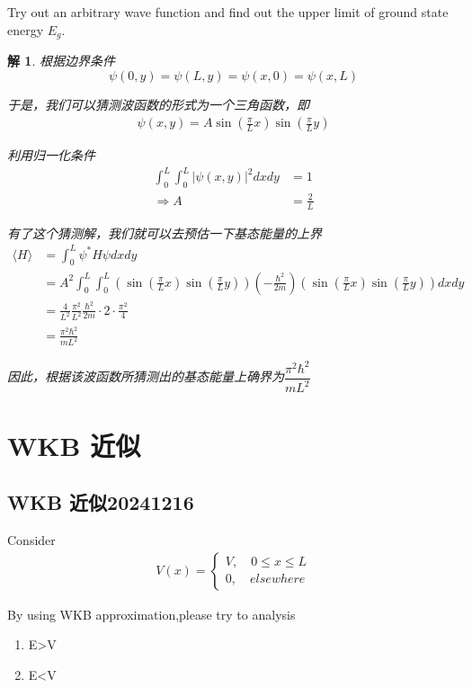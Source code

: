 \documentclass{article}
\newtheorem{solution}{解}
\newcommand{\expectation}[1]{\langle #1 \rangle}
\begin{document}
Try out an arbitrary wave function and find out the upper limit of ground state energy $E_g$.


\begin{solution}
    根据边界条件
    \[
        \psi(0,y)=\psi(L,y)=\psi(x,0)=\psi(x,L)
    \]

    于是，我们可以猜测波函数的形式为一个三角函数，即
    \begin{align*}
        \psi(x,y)=A\sin(\frac{\pi}{L}x)\sin(\frac{\pi}{L}y)
    \end{align*}

    利用归一化条件
    \begin{align*}
        \int_{0}^{L}\int_{0}^{L}|\psi(x,y)|^2dxdy&=1\\
        \Rightarrow A&=\frac{2}{L}
    \end{align*}

    有了这个猜测解，我们就可以去预估一下基态能量的上界
    \begin{align*}
        \expectation{H}&=\int_{0}^{L}\psi^*H\psi dxdy\\
        &=A^2\int_{0}^{L}\int_{0}^{L}\left(\sin(\frac{\pi}{L}x)\sin(\frac{\pi}{L}y)\right)\left(-\frac{\hbar^2}{2m}\right)\left(\sin(\frac{\pi}{L}x)\sin(\frac{\pi}{L}y)\right)dxdy\\
        &=\frac{4}{L^2}\frac{\pi^2}{L^2}\frac{\hbar^2}{2m}\cdot2\cdot\frac{\pi^2}{4}\\
        &=\frac{\pi^2\hbar^2}{mL^2}
    \end{align*}

    因此，根据该波函数所猜测出的基态能量上确界为$\dfrac{\pi^2\hbar^2}{mL^2}$
\end{solution}



\section{WKB 近似}
\subsection{WKB 近似20241216}
Consider 
\begin{align*}
    V(x)=
    \begin{cases}
        V,\quad 0\leq x\leq L\\
        0,\quad elsewhere
    \end{cases}
\end{align*}

By using WKB approximation,please try to analysis 
\begin{enumerate}
    \item E>V
    \item E<V
\end{enumerate}
\end{document}
